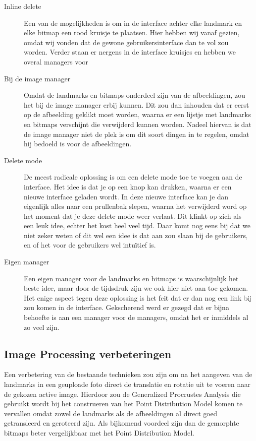 \begin{description}
  \item[Inline delete] Een van de mogelijkheden is om in de interface achter elke landmark en elke bitmap een rood kruisje te plaatsen.
  Hier hebben wij vanaf gezien, omdat wij vonden dat de gewone gebruikersinterface dan te vol zou worden.
  Verder staan er nergens in de interface kruisjes en hebben we overal managers voor
  \item[Bij de image manager] Omdat de landmarks en bitmaps onderdeel zijn van de afbeeldingen, zou het bij de image manager erbij kunnen.
  Dit zou dan inhouden dat er eerst op de afbeelding geklikt moet worden, waarna er een lijstje met landmarks en bitmaps verschijnt die verwijderd kunnen worden.
  Nadeel hiervan is dat de image manager niet de plek is om dit soort dingen in te regelen, omdat hij bedoeld is voor de afbeeldingen.
  \item[Delete mode]De meest radicale oplossing is om een delete mode toe te voegen aan de interface.
  Het idee is dat je op een knop kan drukken, waarna er een nieuwe interface geladen wordt.
  In deze nieuwe interface kan je dan eigenlijk alles naar een prullenbak slepen, waarna het verwijderd word op het moment dat je deze delete mode weer verlaat.
  Dit klinkt op zich als een leuk idee, echter het kost heel veel tijd.
  Daar komt nog eens bij dat we niet zeker weten of dit wel een idee is dat aan zou slaan bij de gebruikers, en of het voor de gebruikers wel intu\"{i}tief is.
  \item[Eigen manager] Een eigen manager voor de landmarks en bitmaps is waarschijnlijk het beste idee, maar door de tijdsdruk zijn we ook hier niet aan toe gekomen.
  Het enige aspect tegen deze oplossing is het feit dat er dan nog een link bij zou komen in de interface.
  Gekscherend werd er gezegd dat er bijna behoefte is aan een manager voor de managers, omdat het er inmiddels al zo veel zijn.
\end{description}

\subsection{Image Processing verbeteringen}
Een verbetering van de bestaande technieken zou zijn om na het aangeven van de landmarks in een geuploade foto direct de translatie en rotatie uit te voeren naar de gekozen active image. Hierdoor zou de Generalized Procrustes Analysis die gebruikt wordt bij het construeren van het Point Distribution Model komen te vervallen omdat zowel de landmarks als de afbeeldingen al direct goed getransleerd en geroteerd zijn. Als bijkomend voordeel zijn dan de gemorphte bitmaps beter vergelijkbaar met het Point Distribution Model.


